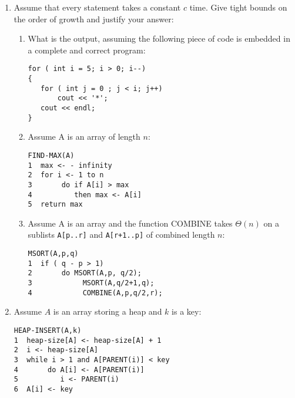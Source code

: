 \begin{enumerate}
\begin{enumerate}
    	\end{enumerate}
	\item Assume that every statement takes a constant $c$ time.  Give
		tight bounds on the order of growth and justify your answer:
		\begin{enumerate}
    \item What is the output, assuming the following piece of code
      is embedded in a complete and correct program:
\begin{verbatim}
for ( int i = 5; i > 0; i--)
{
   for ( int j = 0 ; j < i; j++)
       cout << '*';
   cout << endl;
}
\end{verbatim}
\bigskip
			\item Assume A is an array of length $n$:
\begin{verbatim}
FIND-MAX(A)
1  max <- - infinity
2  for i <- 1 to n
3       do if A[i] > max
4          then max <- A[i]
5  return max
\end{verbatim}
\bigskip
			\item Assume A is an array and the function COMBINE takes $\Theta(n)$
				on a sublists {\tt A[p..r]} and {\tt A[r+1..p]} of combined length $n$:
\begin{verbatim}
MSORT(A,p,q)
1  if ( q - p > 1)
2       do MSORT(A,p, q/2);
3            MSORT(A,q/2+1,q);
4            COMBINE(A,p,q/2,r);
\end{verbatim}

		\end{enumerate}
\newpage

\item Assume $A$ is an array storing a heap and $k$ is a key:
\begin{verbatim}
HEAP-INSERT(A,k)
1  heap-size[A] <- heap-size[A] + 1
2  i <- heap-size[A]
3  while i > 1 and A[PARENT(i)] < key
4       do A[i] <- A[PARENT(i)]
5          i <- PARENT(i)
6  A[i] <- key
\end{verbatim}


\end{enumerate}
